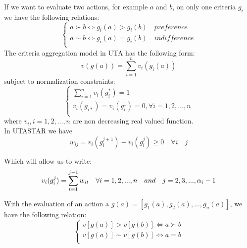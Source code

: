 \documentclass{report}
\begin{document}
If we want to evaluate two actions, for example $a$ and $b$, on only one criteria $g_i$ we have the following relations: 
\begin{equation}
      \begin{cases}
      	a \succ b\Leftrightarrow g_i(a) > g_i(b) \quad preference\\
      	a\sim b \Leftrightarrow g_i(a) = g_i(b) \quad indifference \\
      \end{cases}
\end{equation}
The criteria aggregation model in UTA has the following form:
\begin{equation}\label{eq1}
      v(g(a)) = \sum_{i=1}^{n} v_i (g_i (a))
\end{equation}
subject to normalization constraints:\\
\begin{equation}\label{eq2}
      \begin{cases}
      	\sum_{i=1}^{n} v_i(g_{i}^{*}) = 1\\
       	v_i(g_{i*})= v_i(g_i^1)  = 0,  \forall i = 1, 2, ..., n\\
      \end{cases}
\end{equation}
where $ v_i, i = 1,2,...,n$ are non decreasing real valued function.\\

In UTASTAR we have 
\begin{equation}
	w_{ij} = v_i(g_i^{j+1}) - v_i(g_i^{j}) \geq 0 \quad \forall i \quad j 
\end{equation}

Which will allow us to write: 
\begin{equation}
	v_i(g_i^j) =	  \sum_{t=1}^{j-1} w_{it} \quad \forall i = 1,2,...,n \quad and \quad j = 2,3,...,\alpha _i -1 \\
\end{equation}

With the evaluation of an action a $g(a) = [g_1(a) ,  g_2(a) , ... , g_n(a)] $, we have the following relation:
\begin{equation}
      \begin{cases}
      	v[g(a)] > v[g(b)] \Leftrightarrow a \succ b\\
      	v[g(a)] \sim v[g(b)] \Leftrightarrow a = b\\
      \end{cases}
\end{equation}
\end{document}
